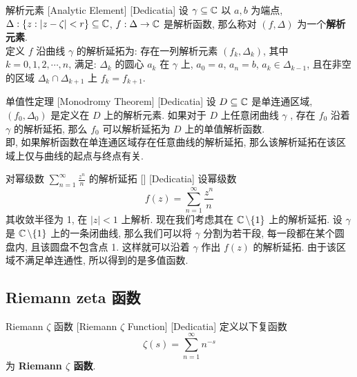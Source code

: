         \begin{dfn}
            {解析元素}
            [Analytic Element]
            [Dedicatia]
            设 \(\gamma\subseteq\operatorname{\mathbb{C}}\) 以 \(a,b\) 为端点, \(\Delta:\{z:|z-\zeta|<r\}\subseteq\operatorname{\mathbb{C}}\), \(f:\Delta\to\operatorname{\mathbb{C}}\) 是解析函数, 那么称对 \((f,\Delta)\) 为一个\textbf{解析元素}.\\
            定义 \(f\) 沿曲线 \(\gamma\) 的解析延拓为: 存在一列解析元素 \((f_k,\Delta_k)\), 其中 \(k=0,1,2,\cdots,n\), 满足: \(\Delta_k\) 的圆心 \(a_k\) 在 \(\gamma\) 上, \(a_0=a\), \(a_n=b\), \(a_k\in\Delta_{k-1}\), 且在非空的区域 \(\Delta_k\cap\Delta_{k+1}\) 上 \(f_k=f_{k+1}\).
        \end{dfn}

        \begin{thm}
            [Monodromy]
            {单值性定理}
            [Monodromy Theorem]
            [Dedicatia]
            设 \(D\subseteq\operatorname{\mathbb{C}}\) 是单连通区域, \((f_0,\Delta_0)\) 是定义在 \(D\) 上的解析元素. 如果对于 \(D\) 上任意闭曲线 \(\gamma\) , 存在 \(f_0\) 沿着 \(\gamma\) 的解析延拓, 那么 \(f_0\) 可以解析延拓为 \(D\) 上的单值解析函数.\\
            即, 如果解析函数在单连通区域存在任意曲线的解析延拓, 那么该解析延拓在该区域上仅与曲线的起点与终点有关.
        \end{thm}

        \begin{xmp}
            {对幂级数 \(\sum_{n = 1}^{\infty}\frac{z^n}{n} \) 的解析延拓}
            []
            [Dedicatia]
            设幂级数
            \[f(z)=\sum_{n=1}^{\infty}\frac{z^n}{n}\]
            其收敛半径为 1, 在 \(|z|<1\) 上解析. 现在我们考虑其在 \(\operatorname{\mathbb{C}}\setminus\{1\}\) 上的解析延拓. 设 \(\gamma\) 是 \(\operatorname{\mathbb{C}}\setminus\{1\}\) 上的一条闭曲线, 那么我们可以将 \(\gamma\) 分割为若干段, 每一段都在某个圆盘内, 且该圆盘不包含点 1. 这样就可以沿着 \(\gamma\) 作出 \(f(z)\) 的解析延拓. 由于该区域不满足单连通性, 所以得到的是多值函数.\\
            \continued
        \end{xmp}

    \subsection{Riemann zeta 函数}

        \begin{dfn}
            {Riemann \(\zeta\) 函数}
            [Riemann \(\zeta\) Function]
            [Dedicatia]
            定义以下复函数
            \[\zeta(s)=\sum_{n=1}^{\infty}n^{-s}\]
            为 \textbf{Riemann \(\zeta\) 函数}.
        \end{dfn}


